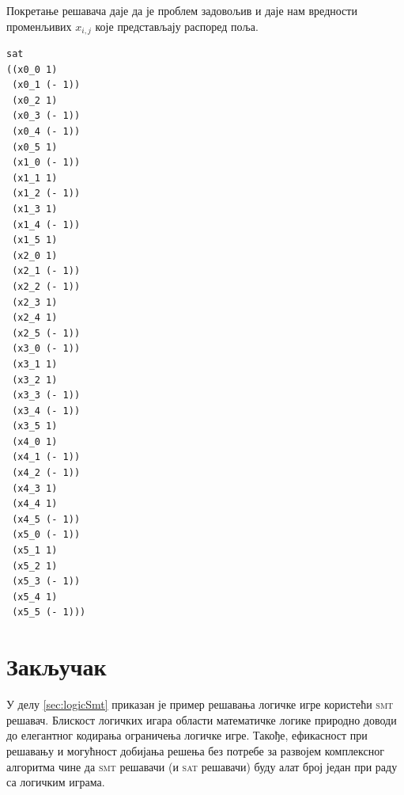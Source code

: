 \documentclass[a4paper]{article}
\begin{document}
Покретање решавача даје да је проблем задовољив и даје нам вредности променљивих $x_{i, j}$ које представљају
распоред поља.

\begin{verbatim}
sat
((x0_0 1)
 (x0_1 (- 1))
 (x0_2 1)
 (x0_3 (- 1))
 (x0_4 (- 1))
 (x0_5 1)
 (x1_0 (- 1))
 (x1_1 1)
 (x1_2 (- 1))
 (x1_3 1)
 (x1_4 (- 1))
 (x1_5 1)
 (x2_0 1)
 (x2_1 (- 1))
 (x2_2 (- 1))
 (x2_3 1)
 (x2_4 1)
 (x2_5 (- 1))
 (x3_0 (- 1))
 (x3_1 1)
 (x3_2 1)
 (x3_3 (- 1))
 (x3_4 (- 1))
 (x3_5 1)
 (x4_0 1)
 (x4_1 (- 1))
 (x4_2 (- 1))
 (x4_3 1)
 (x4_4 1)
 (x4_5 (- 1))
 (x5_0 (- 1))
 (x5_1 1)
 (x5_2 1)
 (x5_3 (- 1))
 (x5_4 1)
 (x5_5 (- 1)))
\end{verbatim}


\section{Закључак}
У делу \ref{sec:logicSmt} приказан је пример решавања логичке игре користећи \textsc{smt} решавач. Блискост логичких игара области математичке
логике природно доводи до елегантног кодирања ограничења логичке игре. Такође, ефикасност при решавању и могућност добијања
решења без потребе за развојем комплексног алгоритма чине да \textsc{smt} решавачи (и \textsc{sat} решавачи) буду алат број један при раду
са логичким играма.


\newpage

\appendix


\end{document}
